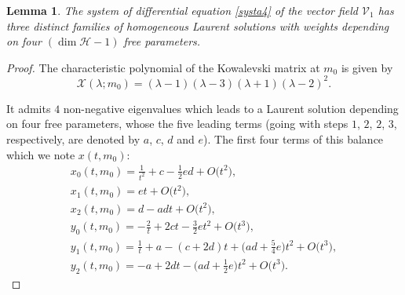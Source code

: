 \documentclass[pdftex]{sigma}
\numberwithin{equation}{section}
\newtheorem{Lemma}[Theorem]{Lemma}
\begin{document}
 \begin{Lemma}
The system of differential equation \eqref{systa4} of the vector
field $\mathcal{V}_1$ has three distinct families of homogeneous
Laurent solutions with weights depending on four $(\dim\mathcal{H}-1)$ free parameters.
\end{Lemma}
\begin{proof}

The characteristic polynomial of the Kowalevski matrix at $m_0$ is
given by
 \[\mathcal{X}( \lambda;m_0)= ( \lambda-1 ) ( \lambda-3 ) ( \lambda+1
 )( \lambda-2 ) ^{2}.\]

 It admits $4$ non-negative eigenvalues which leads
to a Laurent solution depending on four free parameters, whose the
five leading terms (going with steps $1$, $2$, $2$, $3$, respectively, are
denoted by $a$, $c$, $d$ and $e$). The first four terms of this balance
which we note $x(t,m_0)$:
\begin{gather}
 x_0(t,m_0) = \frac{1}{t^2}+c-\frac{1}{2}ed+O\bigl(t^2\bigr), \nonumber\\
 x_1(t,m_0) = et+O\bigl(t^2\bigr), \nonumber\\
 x_2(t,m_0) = d-adt+O\bigl(t^2\bigr), \nonumber\\
 y_0(t,m_0) = -\frac{2}{t}+2ct-\frac{3}{2}et^2+O\bigl(t^3\bigr), \nonumber\\
 y_1(t,m_0) = \frac{1}{t}+a-(c+2d)t+\biggl(ad+\frac{5}{4}e \biggr)t^2+O\bigl(t^3\bigr),\nonumber\\
 y_2(t,m_0) = -a+2dt-\biggl(ad+\frac{1}{2}e\biggr)t^2+O\bigl(t^3 \bigr).\label{balancemainm0}
\end{gather}


\end{proof}
\end{document}
